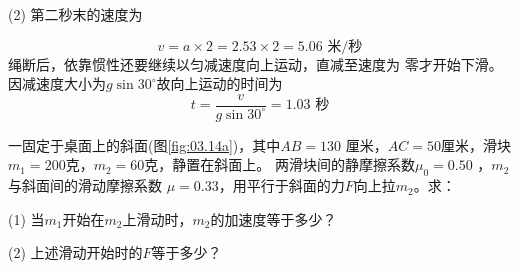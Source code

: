 (2) 第二秒末的速度为

\vspace{-1.56em}
\begin{equation*}
  v = a \times 2 = 2 . 5 3 \times 2 = 5 . 0 6 \text{ 米/秒}
\end{equation*}
绳断后，依靠惯性还要继续以匀减速度向上运动，直减至速度为
零才开始下滑。因减速度大小为$  g \sin 3 0 ^ { \circ } $故向上运动的时间为
\begin{equation*}
  t = \frac { v } { g \sin 3 0 ^ { \circ } } = 1 . 0 3\text{ 秒}
\end{equation*}

\example 一固定于桌面上的斜面(图\ref{fig:03.14a})，其中$  A B = 1 3 0  $
厘米，$  A C = 5 0  $厘米，滑块$  m _ { 1 } = 2 0 0  $克，$  m _ { 2 } = 6 0  $克，静置在斜面上。
两滑块间的静摩擦系数$  \mu _ { 0 } = 0 . 5 0 $ ，$m_2$与斜面间的滑动摩擦系数
$ \mu = 0 . 3 3  $，用平行于斜面的力$ F $向上拉$m_2$。求：

(1) 当$m_1$开始在$m_2$上滑动时，$m_2$的加速度等于多少？

(2) 上述滑动开始时的$ F $等于多少？
\begin{figure}[h]
    \vspace{-0.5em}
  \centering
  \\
   \qquad
  \caption{}
  \label{fig:03.14}
  \vspace{-0.5em}
\end{figure}

